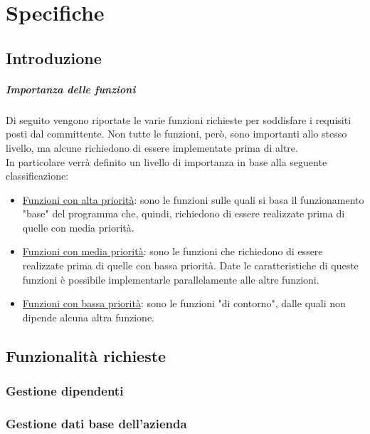 \chapter{Specifiche}
\section{Introduzione}
\paragraph{Importanza delle funzioni}
Di seguito vengono riportate le varie funzioni richieste per soddisfare i requisiti posti dal committente. Non tutte le funzioni, però, sono importanti allo stesso livello, ma alcune richiedono di essere implementate prima di altre.\\
In particolare verrà definito un livello di importanza in base alla seguente classificazione:
\begin{itemize}
	\item \underline{Funzioni con alta priorità}: sono le funzioni sulle quali si basa il funzionamento "base" del programma che, quindi, richiedono di essere realizzate prima di quelle con media priorità.
	\item \underline{Funzioni con media priorità}: sono le funzioni che richiedono di essere realizzate prima di quelle con bassa priorità. Date le caratteristiche di queste funzioni è possibile implementarle parallelamente alle altre funzioni.
	\item \underline{Funzioni con bassa priorità}: sono le funzioni "di contorno", dalle quali non dipende alcuna altra funzione.	 
\end{itemize}
\section{Funzionalità richieste}
\subsection{Gestione dipendenti}

\subsection{Gestione dati base dell'azienda}

